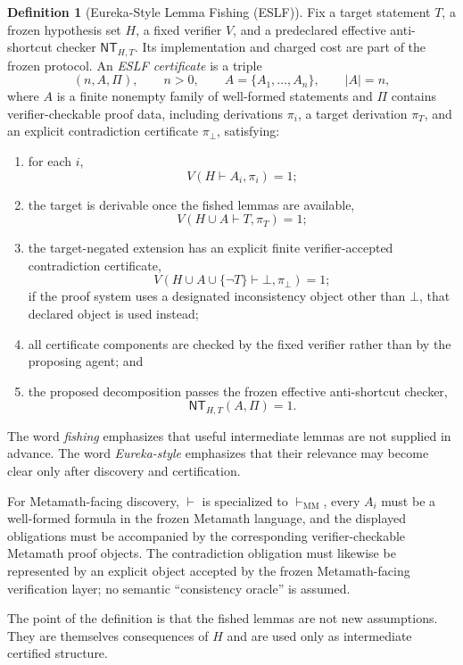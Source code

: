 \documentclass[11pt]{article}
\theoremstyle{definition}
\newtheorem{definition}[theorem]{Definition}
\begin{document}
\begin{definition}[Eureka-Style Lemma Fishing (ESLF)]
Fix a target statement $T$, a frozen hypothesis set $H$, a fixed verifier $V$, and a predeclared effective anti-shortcut checker $\mathsf{NT}_{H,T}$. Its implementation and charged cost are part of the frozen protocol. An \emph{ESLF certificate} is a triple
\[
(n,A,\Pi),
\qquad n>0,
\qquad A=\{A_1,\ldots,A_n\},
\qquad |A|=n,
\]
where $A$ is a finite nonempty family of well-formed statements and $\Pi$ contains verifier-checkable proof data, including derivations $\pi_i$, a target derivation $\pi_T$, and an explicit contradiction certificate $\pi_\bot$, satisfying:
\begin{enumerate}[label=(\roman*)]
\item for each $i$,
\[
V(H\vdash A_i,\pi_i)=1;
\]
\item the target is derivable once the fished lemmas are available,
\[
V(H\cup A\vdash T,\pi_T)=1;
\]
\item the target-negated extension has an explicit finite verifier-accepted contradiction certificate,
\[
\boxed{V(H\cup A\cup\{\neg T\}\vdash\bot,\pi_\bot)=1};
\]
if the proof system uses a designated inconsistency object other than $\bot$, that declared object is used instead;
\item all certificate components are checked by the fixed verifier rather than by the proposing agent; and
\item the proposed decomposition passes the frozen effective anti-shortcut checker,
\[
\mathsf{NT}_{H,T}(A,\Pi)=1.
\]
\end{enumerate}
The word \emph{fishing} emphasizes that useful intermediate lemmas are not supplied in advance. The word \emph{Eureka-style} emphasizes that their relevance may become clear only after discovery and certification.
\end{definition}

For Metamath-facing discovery, $\vdash$ is specialized to $\vdash_{\mathrm{MM}}$, every $A_i$ must be a well-formed formula in the frozen Metamath language, and the displayed obligations must be accompanied by the corresponding verifier-checkable Metamath proof objects. The contradiction obligation must likewise be represented by an explicit object accepted by the frozen Metamath-facing verification layer; no semantic ``consistency oracle'' is assumed.

The point of the definition is that the fished lemmas are not new assumptions. They are themselves consequences of $H$ and are used only as intermediate certified structure.
\end{document}
